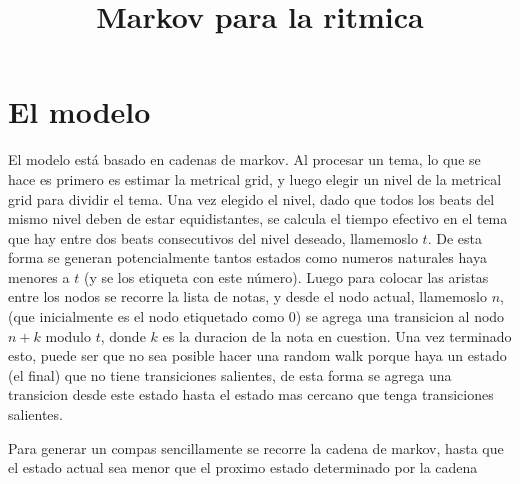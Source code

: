 \documentclass[a4paper,10pt]{article}
\title{Markov para la ritmica}
\begin{document}
\maketitle
\section{El modelo}
El modelo est\'a basado en cadenas de markov. Al procesar un tema, lo que se hace es primero es estimar la metrical 
grid, y luego elegir un nivel de la metrical grid para dividir el tema.
Una vez elegido el nivel, dado que todos los beats del mismo nivel deben de estar equidistantes, se calcula el 
tiempo efectivo en el tema que hay entre dos beats consecutivos del nivel deseado, llamemoslo $t$.
De esta forma se generan potencialmente tantos estados como numeros naturales haya menores a $t$ (y se los etiqueta con este n\'umero).
Luego para colocar las aristas entre los nodos se recorre la lista de notas, y desde el nodo actual, llamemoslo
$n$, (que inicialmente es el nodo etiquetado como 0) se agrega una transicion al nodo $n+k$ modulo $t$,
donde $k$ es la duracion de la nota en cuestion.
Una vez terminado esto, puede ser que no sea posible hacer una random walk porque haya un estado (el final) que no
tiene transiciones salientes, de esta forma se agrega una transicion desde este estado hasta el estado mas cercano
que tenga transiciones salientes.

Para generar un compas sencillamente se recorre la cadena de markov, hasta que el estado actual sea menor que el proximo estado determinado por la cadena
\end{document}
